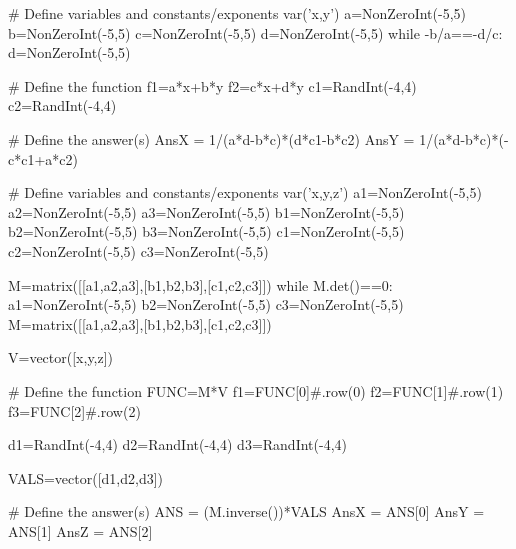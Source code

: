 \begin{sagesilent}
# Define variables and constants/exponents
var('x,y')
a=NonZeroInt(-5,5)
b=NonZeroInt(-5,5)
c=NonZeroInt(-5,5)
d=NonZeroInt(-5,5)
while -b/a==-d/c:
   d=NonZeroInt(-5,5)

# Define the function
f1=a*x+b*y
f2=c*x+d*y
c1=RandInt(-4,4)
c2=RandInt(-4,4)

# Define the answer(s)
AnsX = 1/(a*d-b*c)*(d*c1-b*c2)
AnsY = 1/(a*d-b*c)*(-c*c1+a*c2)

\end{sagesilent}
 


\begin{sagesilent}
# Define variables and constants/exponents
var('x,y,z')
a1=NonZeroInt(-5,5)
a2=NonZeroInt(-5,5)
a3=NonZeroInt(-5,5)
b1=NonZeroInt(-5,5)
b2=NonZeroInt(-5,5)
b3=NonZeroInt(-5,5)
c1=NonZeroInt(-5,5)
c2=NonZeroInt(-5,5)
c3=NonZeroInt(-5,5)

M=matrix([[a1,a2,a3],[b1,b2,b3],[c1,c2,c3]])
while M.det()==0:
   a1=NonZeroInt(-5,5)
   b2=NonZeroInt(-5,5)
   c3=NonZeroInt(-5,5)
   M=matrix([[a1,a2,a3],[b1,b2,b3],[c1,c2,c3]])

V=vector([x,y,z])

# Define the function
FUNC=M*V
f1=FUNC[0]#.row(0)
f2=FUNC[1]#.row(1)
f3=FUNC[2]#.row(2)

d1=RandInt(-4,4)
d2=RandInt(-4,4)
d3=RandInt(-4,4)

VALS=vector([d1,d2,d3])

# Define the answer(s)
ANS = (M.inverse())*VALS
AnsX = ANS[0]
AnsY = ANS[1]
AnsZ = ANS[2]

\end{sagesilent}
 
